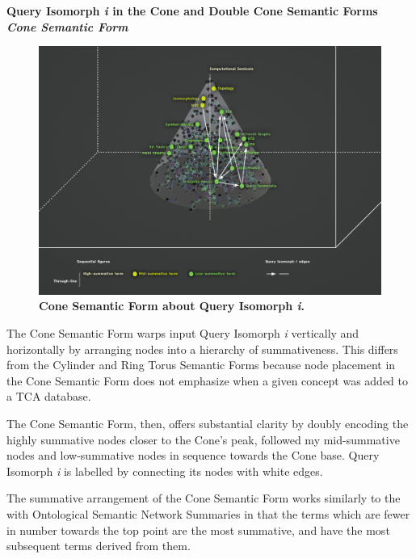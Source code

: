 \noindent \textbf{Query Isomorph \textit{i} in the Cone and Double Cone Semantic Forms}
\\
\textbf{\textit{Cone Semantic Form}}
\FloatBarrier  
\begin{figure}[h!]
    \centering
    \includegraphics[width=\textwidth]{figures/5.13.Cone.png}
    \caption[Cone Semantic Form about Query Isomorph \textit{i}]{\textbf{Cone Semantic Form about Query Isomorph \textit{i}.}}
    \label{f5.13}
\end{figure}
\FloatBarrier  
The Cone Semantic Form warps input Query Isomorph \textit{i} vertically and horizontally by arranging nodes into a hierarchy of summativeness. This differs from the Cylinder and Ring Torus Semantic Forms because node placement in the Cone Semantic Form does not emphasize when a given concept was added to a TCA database. 

The Cone Semantic Form, then, offers substantial clarity by doubly encoding the highly summative nodes closer to the Cone's peak, followed my mid-summative nodes and low-summative nodes in sequence towards the Cone base. Query Isomorph \textit{i} is labelled by connecting its nodes with white edges. 

The summative arrangement of the Cone Semantic Form works similarly to the with Ontological Semantic Network Summaries in that the terms which are fewer in number towards the top point are the most summative, and have the most subsequent terms derived from them. 

